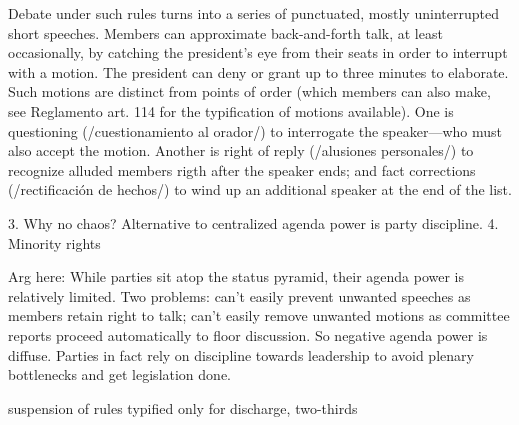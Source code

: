 Debate under such rules turns into a series of punctuated, mostly uninterrupted short speeches. Members can approximate back-and-forth talk, at least occasionally, by catching the president's eye from their seats in order to interrupt with a motion. The president can deny or grant up to three minutes to elaborate. Such motions are distinct from points of order (which members can also make, see Reglamento art. 114 for the typification of motions available). One is questioning (/cuestionamiento al orador/) to interrogate the speaker---who must also accept the motion. Another is right of reply (/alusiones personales/) to recognize alluded members rigth after the speaker ends; and fact corrections (/rectificación de hechos/) to wind up an additional speaker at the end of the list. 


3. Why no chaos? Alternative to centralized agenda power is party discipline. 
4. Minority rights


Arg here:
While parties sit atop the status pyramid, their agenda power is relatively limited. 
Two problems: can't easily prevent unwanted speeches as members retain right to talk; can't easily remove unwanted motions as committee reports proceed automatically to floor discussion. So negative agenda power is diffuse. 
Parties in fact rely on discipline towards leadership to avoid plenary bottlenecks and get legislation done. 

suspension of rules typified only for discharge, two-thirds



